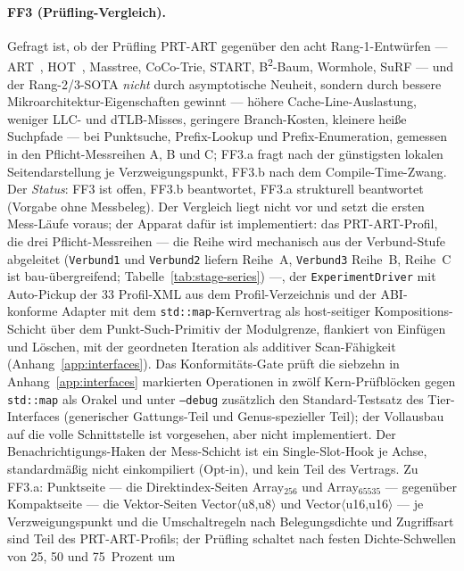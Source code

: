 \begin{nurlang}
\paragraph{FF3 (Prüfling-Vergleich).} Gefragt ist, ob der Prüfling PRT-ART gegenüber den acht
Rang-1-Entwürfen --- ART~\cite{leis2013art}, HOT~\cite{binna2018hot}, Masstree, CoCo-Trie, START,
B\textsuperscript{2}-Baum, Wormhole, SuRF --- und der Rang-2/3-SOTA \emph{nicht} durch asymptotische
Neuheit, sondern durch bessere Mikroarchitektur-Eigenschaften gewinnt --- höhere Cache-Line-Auslastung,
weniger LLC- und dTLB-Misses, geringere Branch-Kosten, kleinere heiße Suchpfade --- bei Punktsuche,
Prefix-Lookup und Prefix-Enumeration, gemessen in den Pflicht-Messreihen A, B und C\@; FF3.a fragt nach
der günstigsten lokalen Seitendarstellung je Verzweigungspunkt, FF3.b nach dem Compile-Time-Zwang.
Der \emph{Status}: FF3 ist offen, FF3.b beantwortet, FF3.a strukturell beantwortet (Vorgabe ohne Messbeleg). Der
Vergleich liegt nicht vor und setzt die ersten Mess-Läufe voraus; der Apparat dafür ist implementiert: das PRT-ART-Profil, die
drei Pflicht-Messreihen --- die Reihe wird mechanisch aus der Verbund-Stufe abgeleitet
(\texttt{Verbund1} und \texttt{Verbund2} liefern Reihe~A, \texttt{Verbund3} Reihe~B, Reihe~C ist
bau-übergreifend; Tabelle~\ref{tab:stage-series}) ---, der \texttt{ExperimentDriver} mit Auto-Pickup
der 33 Profil-XML aus dem Profil-Verzeichnis und der ABI-konforme Adapter mit dem
\texttt{std::map}-Kernvertrag als host-seitiger Kompositions-Schicht über dem Punkt-Such-Primitiv
der Modulgrenze, flankiert von Einfügen und Löschen, mit der geordneten Iteration als additiver
Scan-Fähigkeit (Anhang~\ref{app:interfaces}). Das Konformitäts-Gate prüft die siebzehn in
Anhang~\ref{app:interfaces} markierten Operationen in zwölf Kern-Prüfblöcken gegen \texttt{std::map}
als Orakel und unter \texttt{--debug} zusätzlich den Standard-Testsatz des Tier-Interfaces (generischer
Gattungs-Teil und Genus-spezieller Teil); der Vollausbau auf die volle Schnittstelle ist vorgesehen,
aber nicht implementiert. Der
Benachrichtigungs-Haken der Mess-Schicht ist
ein Single-Slot-Hook je Achse, standardmäßig nicht einkompiliert (Opt-in), und kein Teil des Vertrags.
Zu FF3.a: Punktseite --- die Direktindex-Seiten Array$_{256}$ und Array$_{65535}$ --- gegenüber
Kompaktseite --- die Vektor-Seiten Vector$\langle$u8,u8$\rangle$ und Vector$\langle$u16,u16$\rangle$
--- je Verzweigungspunkt und die Umschaltregeln nach Belegungsdichte und Zugriffsart sind Teil des
PRT-ART-Profils; der Prüfling schaltet nach festen Dichte-Schwellen von 25, 50 und 75~Prozent um

\end{nurlang}
